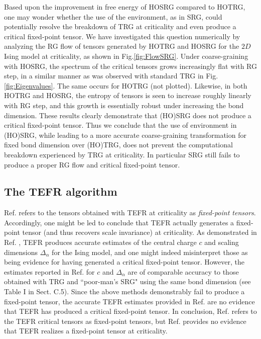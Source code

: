 \documentclass[aps,prl,twocolumn,showpacs,superscriptaddress,floatfix,10pt]{revtex4-1}
\begin{document}
Based upon the improvement in free energy of HOSRG compared to HOTRG, one may wonder whether the use of the environment, as in SRG, could potentially resolve the breakdown of TRG at criticality and even produce a critical fixed-point tensor. We have investigated this question numerically by analyzing the RG flow of tensors generated by HOTRG and HOSRG for the $2D$ Ising model at criticality, as shown in Fig.\ref{fig:FlowSRG}. Under coarse-graining with HOSRG, the spectrum of the critical tensors grows increasingly flat with RG step, in a similar manner as was observed with standard TRG in Fig.\ref{fig:Eigenvalues}. The same occurs for HOTRG (not plotted). Likewise, in both HOTRG and HOSRG, the entropy of tensors is seen to increase roughly linearly with RG step, and this growth is essentially robust under increasing the bond dimension. These results clearly demonstrate that (HO)SRG does not produce a critical fixed-point tensor. Thus we conclude that the use of environment in (HO)SRG, while leading to a more accurate coarse-graining transformation for fixed bond dimension over (HO)TRG, does not prevent the computational breakdown experienced by TRG at criticality. In particular SRG still fails to produce a proper RG flow and critical fixed-point tensor.

\subsection{The TEFR algorithm}

Ref. \cite{TEFR} refers to the tensors obtained with TEFR at criticality as \textit{fixed-point tensors}. Accordingly, one might be led to conclude that TEFR actually generates a fixed-point tensor (and thus recovers scale invariance) at criticality. As demonstrated in Ref. \cite{TEFR}, TEFR produces accurate estimates of the central charge $c$ and scaling dimensions $\Delta_{\alpha}$ for the Ising model, and one might indeed misinterpret those as being evidence for having generated a critical fixed-point tensor. However, the estimates reported in Ref. \cite{TEFR} for $c$ and $\Delta_{\alpha}$ are of comparable accuracy to those obtained with TRG and ``poor-man's SRG" using the same bond dimension (see Table I in Sect. C.5). Since the above methods demonstrably fail to produce a fixed-point tensor, the accurate TEFR estimates provided in Ref. \cite{TEFR} are no evidence that TEFR has produced a critical fixed-point tensor. In conclusion, Ref. \cite{TEFR} refers to the TEFR critical tensors as fixed-point tensors, but Ref. \cite{TEFR} provides no evidence that TEFR realizes a fixed-point tensor at criticality.
\end{document}

